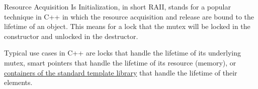 Resource Acquisition Is Initialization, in short RAII, stands for a popular technique in C++ in which the resource acquisition and release are bound to the lifetime of an object. This means for a lock that the mutex will be locked in the constructor and unlocked in the destructor.

Typical use cases in C++ are locks that handle the lifetime of its underlying mutex, smart pointers that handle the lifetime of its resource (memory), or \href{https://en.cppreference.com/w/cpp/container}{containers of the standard template library} that handle the lifetime of their elements.